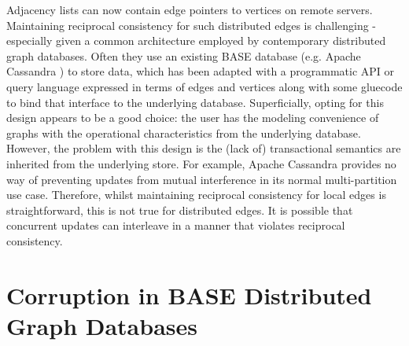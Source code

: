 \documentclass[sigplan,10pt]{acmart}
\begin{document}
Adjacency lists can now contain edge pointers to vertices on remote servers. Maintaining reciprocal consistency for such distributed edges is challenging - especially given a common architecture employed by contemporary distributed graph databases. Often they use an existing BASE database (e.g. Apache Cassandra \cite{Cassandra}) to store data, which has been adapted with a programmatic API or query language expressed in terms of edges and vertices along with some gluecode to bind that interface to the underlying database. Superficially, opting for this design appears to be a good choice: the user has the modeling convenience of graphs with the operational characteristics from the underlying database. However, the problem with this design is the (lack of) transactional semantics are inherited from the underlying store. For example, Apache Cassandra provides no way of preventing updates from mutual interference in its normal multi-partition use case. Therefore, whilst maintaining reciprocal consistency for local edges is straightforward, this is not true for distributed edges. It is possible that concurrent updates can interleave in a manner that violates reciprocal consistency.


\section{Corruption in BASE  Distributed Graph Databases}
\label{sec:db-corruption}
\end{document}
